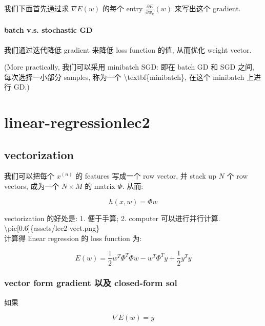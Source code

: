 \documentclass[lang=cn,11pt]{elegantbook}
\begin{document}
我们下面首先通过求 \(\nabla E(w)\) 的每个 entry
\(\frac{\partial E}{\partial w_k}(w)\) 来写出这个 gradient.


\hypertarget{batch-vs-stochastic-gd}{%
\subsubsection{batch v.s. stochastic GD}\label{batch-vs-stochastic-gd}}

我们通过迭代降低 gradient 来降低 loss function 的值, 从而优化 weight
vector.


(More practically, 我们可以采用 minibatch SGD: 即在 batch GD 和 SGD
之间, 每次选择一小部分 samples, 称为一个
\textbackslash textbf\{minibatch\}, 在这个 minibatch 上进行 GD.)

\chapter{linear-regressionlec2}

\hypertarget{vectorization}{%
\section{vectorization}\label{vectorization}}

我们可以把每个 \(x^{(n)}\) 的 features 写成一个 row vector, 并 stack up
\(N\) 个 row vectors, 成为一个 \(N\times M\) 的 matrix \(\Phi\). 从而:

\[h(x,w) = \Phi w\]

vectorization 的好处是: 1. 便于手算; 2. computer 可以进行并行计算.\\
\textbackslash pic{[}0.6{]}\{assets/lec2-vect.png\}\\
计算得 linear regression 的 loss function 为:

\[E(w) = \frac{1}{2}w^T \Phi^T \Phi w - w^T \Phi^T y + \frac{1}{2}y^T y\]

\hypertarget{vector-form-gradient-ux4ee5ux53ca-closed-form-sol}{%
\subsection{vector form gradient 以及 closed-form
sol}\label{vector-form-gradient-ux4ee5ux53ca-closed-form-sol}}

如果

\[\nabla E(w) = y\]
\end{document}
